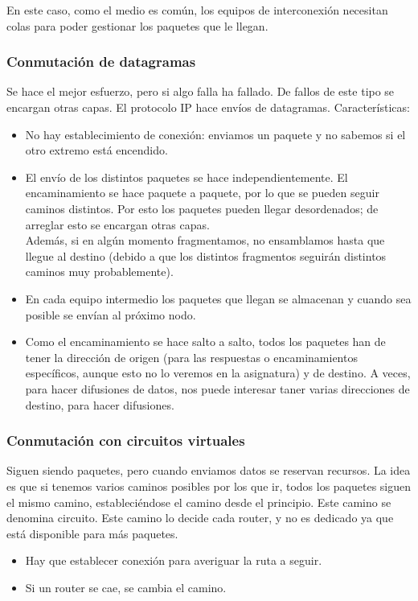 En este caso, como el medio es común, los equipos de interconexión necesitan colas para poder gestionar los paquetes que le llegan. 

\subsubsection{Conmutación de datagramas}
Se hace el mejor esfuerzo, pero si algo falla ha fallado.  De fallos de este tipo se encargan otras capas. El protocolo \acrshort{IP} hace envíos de datagramas.
Características:
\begin{itemize}
    \item No hay establecimiento de conexión: enviamos un paquete y no sabemos si el otro extremo está encendido.
    \item El envío de los distintos paquetes se hace independientemente. El encaminamiento se hace paquete a paquete, por lo que se pueden seguir caminos distintos. Por esto los paquetes pueden llegar desordenados; de arreglar esto se encargan otras capas. \\
        Además, si en algún momento fragmentamos, no ensamblamos hasta que llegue al destino (debido a que los distintos fragmentos seguirán distintos caminos muy probablemente).  
    \item En cada equipo intermedio los paquetes que llegan se almacenan y cuando sea posible se envían al próximo nodo. 
    \item Como el encaminamiento se hace salto a salto, todos los paquetes han de tener la dirección de origen (para las respuestas o encaminamientos específicos, aunque esto no lo veremos en la asignatura) y de destino. A veces, para hacer difusiones de datos, nos puede interesar taner varias direcciones de destino, para hacer difusiones.
\end{itemize}

\subsubsection{Conmutación con circuitos virtuales} 

Siguen siendo paquetes, pero cuando enviamos datos se reservan recursos. 
La idea es que si tenemos varios caminos posibles por los que ir, todos los paquetes siguen el mismo camino, estableciéndose el camino desde el principio. Este camino se denomina circuito. Este camino lo decide cada router, y no es dedicado ya que está disponible para más paquetes. 

\begin{itemize}
    \item Hay que establecer conexión para averiguar la ruta a seguir. 
    \item Si un router se cae, se cambia el camino. 
\end{itemize}


